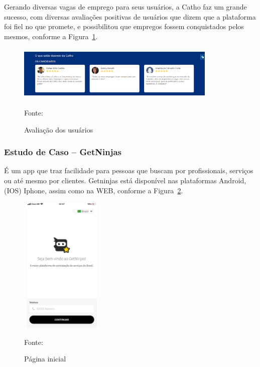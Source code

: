 Gerando diversas vagas de emprego para seus usuários, a Catho faz um grande sucesso, com diversas avaliações positivas de usuários que dizem que a plataforma foi fiel no que promete, e possibilitou que empregos fossem conquistados pelos mesmos, conforme a Figura~\hypersetup{linkcolor=black}\ref{fig:Avaliação}.

\begin{figure}[!h]
	\centering		
	\caption{Avaliação dos usuários}
	\includegraphics[width=360px, height=100px]{./images/cathoMobile1.png}
	\label{fig:Avaliação}
	\par {Fonte: \cite{catho-3}}
\end{figure}

\newpage
\subsubsection{Estudo de Caso – GetNinjas}

É um app que traz facilidade para pessoas que buscam por profissionais, serviços ou até mesmo por clientes. Getninjas está disponível nas plataformas Android, (IOS) Iphone, assim como na WEB, conforme a Figura~\hypersetup{linkcolor=black}\ref{fig:get}.

\begin{figure}[!h]
	\centering
			
	\caption{Página inicial}
	\includegraphics[width=150px, height=250px]{./images/getNinjasMobile2.jpeg}
	\label{fig:get}
	\par {Fonte: \cite{get-ninjasMobilea}}
\end{figure}

